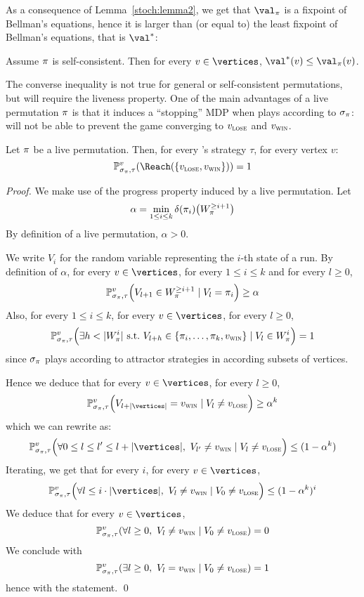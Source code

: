 As a consequence of Lemma~\ref{stoch:lemma2}, we get that $\val_\perm$
is a fixpoint of Bellman's equations, hence it is larger than (or
equal to) the least fixpoint of Bellman's equations, that is $\val^*$:

\begin{corollary}
  Assume $\pi$ is self-consistent.  Then for every $v \in
  \vertices$, $\val^*(v) \le \val_\perm(v)$.
\end{corollary}

The converse inequality is not true for general or self-consistent
permutations, but will require the liveness property. One of the main
advantages of a live permutation $\pi$ is that it induces a
``stopping'' MDP when \Eve plays according to $\sigma_\pi$: \Adam
will not be able to prevent the game converging to $v_{\textsc{lose}}$ and $v_{\textsc{win}}$.

\begin{lemma}
  \label{stoch:lemma:stopping}
  Let $\pi$ be a live permutation. Then, for every \Adam's strategy
  $\tau$, for every vertex $v$:
  \[
  \probm^v_{\sigma_\perm,\tau} (\Reach(\{\vlose,\vwin\})) = 1
  \]
\end{lemma}

\begin{proof}
  We make use of the progress property induced by a live permutation.
  Let
  \[
  \alpha = \min_{1 \le i \le k} \delta(\pi_i) \big(W_\pi^{\ge
    i+1}\big)
  \]
  By definition of a live permutation, $\alpha>0$.

  We write $V_i$ for the random variable representing the $i$-th state
  of a run.
  By definition of $\alpha$, for every $v \in \vertices$, for every $1
  \le i \le k$ and for every $l \ge 0$,
  \[
  \mathbb{P}^v_{\sigma_\pi,\tau}\Big(V_{l+1} \in W_\pi^{\ge i+1} \mid
  V_l = \pi_i\Big) \ge \alpha
  \]
  Also, for every $1 \le i \le k$, for every $v \in \vertices$, for
  every $l \ge 0$,
  \[
  \mathbb{P}^v_{\sigma_\pi,\tau}\Big(\exists h < |W_\pi^i|\
  \text{s.t.}\ V_{l+h} \in \{\pi_i,\ldots,\pi_k,v_{\textsc{win}}\} \mid V_l
  \in W_\pi^i\Big)=1
  \]
  since $\sigma_\pi$ plays according to attractor strategies in
  according subsets of vertices.

  Hence we deduce that for every $v \in \vertices$, for every $l \ge
  0$,
  \[
  \probm^v_{\sigma_\perm,\tau}\Big(V_{l+|\vertices|}=\vwin \mid V_l
  \ne \vlose\Big) \ge \alpha^k
  \]
  which we can rewrite as:
  \[
  \probm^v_{\sigma_\perm,\tau}\Big(\forall 0 \le l \le l' \le
  l+|\vertices|,\ V_{l'} \ne \vwin \mid V_l \ne \vlose\Big) \le
  (1-\alpha^k)
  \]
  Iterating, we get that for every $i$, for every $v \in \vertices$,
  \[
  \probm^v_{\sigma_\perm,\tau}\Big(\forall l \le i \cdot |\vertices|,\
  V_{l} \ne \vwin \mid V_0 \ne \vlose\Big) \le (1-\alpha^k)^i
  \]
  We  deduce that for every $v \in \vertices$,
  \[
  \probm^v_{\sigma_\perm,\tau}(\forall l \ge 0,\ V_l \ne \vwin \mid
  V_0 \ne \vlose) = 0
  \]
  We conclude with
  \[
  \probm^v_{\sigma_\perm,\tau}(\exists l \ge 0,\ V_l = \vwin \mid V_0
  \ne \vlose) = 1
  \]
  hence with the statement. \qed
\end{proof}


